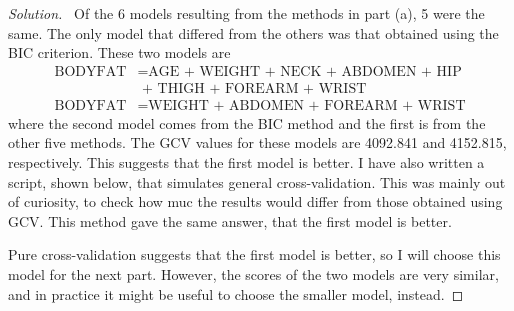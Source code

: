 \documentclass[12pt]{article}
\begin{document}
\begin{enumerate}[leftmargin=0cm,itemindent=.5cm,labelwidth=\itemindent,labelsep=0cm,align=left]
\begin{proof}[Solution]

\ Of the 6 models resulting from the methods in part (a), 5 were the same.  The only model that differed from the others was that obtained using the BIC criterion.  These two models are
\begin{align*}
\text{BODYFAT} &= \text{AGE + WEIGHT + NECK + ABDOMEN + HIP}\\ &\text{\ + THIGH + FOREARM + WRIST}
\\
\text{BODYFAT} &= \text{WEIGHT + ABDOMEN + FOREARM + WRIST}
\end{align*}
where the second model comes from the BIC method and the first is from the other five methods.  The GCV values for these models are 4092.841 and 4152.815, respectively.  This suggests that the first model is better.  I have also written a script, shown below, that simulates general cross-validation.  This was mainly out of curiosity, to check how muc the results would differ from those obtained using GCV.  This method gave the same answer, that the first model is better.

Pure cross-validation suggests that the first model is better, so I will choose this model for the next part.  However, the scores of the two models are very similar, and in practice it might be useful to choose the smaller model, instead.

\end{proof}
\end{enumerate}
\end{document}
